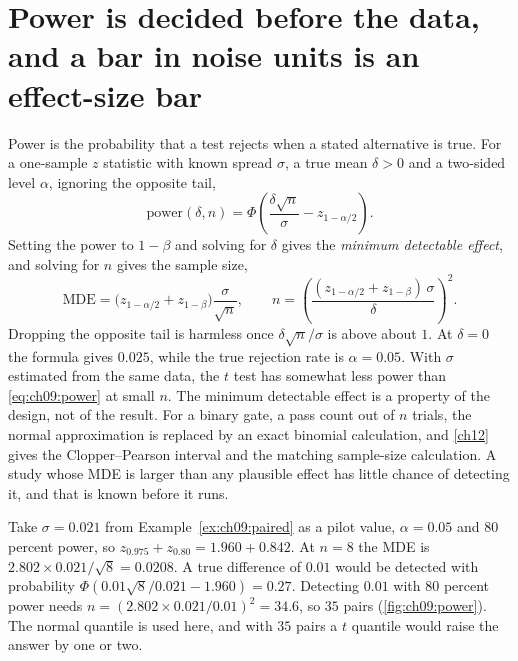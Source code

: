 \section{Power is decided before the data, and a bar in noise units is an effect-size bar}\label{sec:ch09:power}

Power is the probability that a test rejects when a stated alternative is true. For a one-sample $z$ statistic with known spread $\sigma$, a true mean $\delta>0$ and a two-sided level $\alpha$, ignoring the opposite tail,
\begin{equation}
\text{power}(\delta,n)=\Phi\!\left(\frac{\delta\sqrt n}{\sigma}-z_{1-\alpha/2}\right).
\label{eq:ch09:power}
\end{equation}
Setting the power to $1-\beta$ and solving for $\delta$ gives the \emph{minimum detectable effect}, and solving for $n$ gives the sample size,
\begin{equation}
\mathrm{MDE}=\big(z_{1-\alpha/2}+z_{1-\beta}\big)\frac{\sigma}{\sqrt n},\qquad n=\left(\frac{(z_{1-\alpha/2}+z_{1-\beta})\,\sigma}{\delta}\right)^{2}.
\label{eq:ch09:mde}
\end{equation}
Dropping the opposite tail is harmless once $\delta\sqrt n/\sigma$ is above about $1$. At $\delta=0$ the formula gives $0.025$, while the true rejection rate is $\alpha=0.05$. With $\sigma$ estimated from the same data, the $t$ test has somewhat less power than \eqref{eq:ch09:power} at small $n$. The minimum detectable effect is a property of the design, not of the result. For a binary gate, a pass count out of $n$ trials, the normal approximation is replaced by an exact binomial calculation, and \cref{ch12} gives the Clopper--Pearson interval and the matching sample-size calculation. A study whose MDE is larger than any plausible effect has little chance of detecting it, and that is known before it runs.

\begin{example}\label{ex:ch09:mde}
Take $\sigma=0.021$ from Example~\ref{ex:ch09:paired} as a pilot value, $\alpha=0.05$ and $80$ percent power, so $z_{0.975}+z_{0.80}=1.960+0.842$. At $n=8$ the MDE is $2.802\times0.021/\sqrt8=0.0208$. A true difference of $0.01$ would be detected with probability $\Phi(0.01\sqrt8/0.021-1.960)=0.27$. Detecting $0.01$ with $80$ percent power needs $n=(2.802\times0.021/0.01)^2=34.6$, so $35$ pairs (\cref{fig:ch09:power}). The normal quantile is used here, and with $35$ pairs a $t$ quantile would raise the answer by one or two.
\end{example}

